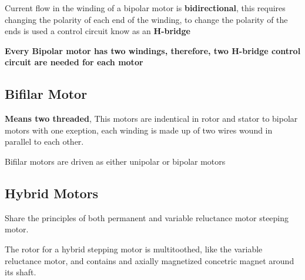 \documentclass{report}
\begin{document}
Current flow in the winding of a bipolar motor is \textbf{bidirectional}, this requires changing the polarity of
each end of the winding, to change the polarity of the ends is used a control circuit know as an \textbf{H-bridge}

\textbf{Every Bipolar motor has two windings, therefore, two H-bridge control circuit are needed for each motor}

\subsection*{Bifilar Motor}
\textbf{Means two threaded}, This motors are indentical in rotor and stator to bipolar motors with one exeption, each 
winding is made up of two wires wound in parallel to each other. 

Bifilar motors are driven as either unipolar or bipolar motors

\subsection*{Hybrid Motors}
Share the principles of both permanent and variable reluctance motor steeping motor. 

The rotor for a hybrid stepping motor is multitoothed, like the variable reluctance motor, and contains and axially
magnetized concetric magnet around its shaft.
\end{document}
